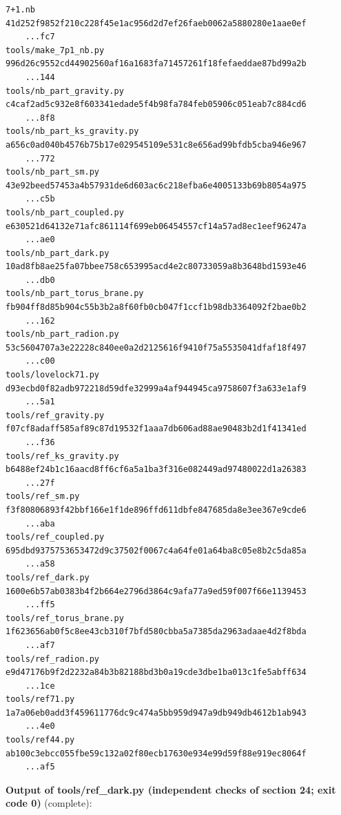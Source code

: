 \documentclass[10pt,a4paper]{article}
\begin{document}
\begin{Verbatim}[fontsize=\small,frame=single,framesep=2mm]
7+1.nb                             41d252f9852f210c228f45e1ac956d2d7ef26faeb0062a5880280e1aae0ef
    ...fc7
tools/make_7p1_nb.py               996d26c9552cd44902560af16a1683fa71457261f18fefaeddae87bd99a2b
    ...144
tools/nb_part_gravity.py           c4caf2ad5c932e8f603341edade5f4b98fa784feb05906c051eab7c884cd6
    ...8f8
tools/nb_part_ks_gravity.py        a656c0ad040b4576b75b17e029545109e531c8e656ad99bfdb5cba946e967
    ...772
tools/nb_part_sm.py                43e92beed57453a4b57931de6d603ac6c218efba6e4005133b69b8054a975
    ...c5b
tools/nb_part_coupled.py           e630521d64132e71afc861114f699eb06454557cf14a57ad8ec1eef96247a
    ...ae0
tools/nb_part_dark.py              10ad8fb8ae25fa07bbee758c653995acd4e2c80733059a8b3648bd1593e46
    ...db0
tools/nb_part_torus_brane.py       fb904ff8d85b904c55b3b2a8f60fb0cb047f1ccf1b98db3364092f2bae0b2
    ...162
tools/nb_part_radion.py            53c5604707a3e22228c840ee0a2d2125616f9410f75a5535041dfaf18f497
    ...c00
tools/lovelock71.py                d93ecbd0f82adb972218d59dfe32999a4af944945ca9758607f3a633e1af9
    ...5a1
tools/ref_gravity.py               f07cf8adaff585af89c87d19532f1aaa7db606ad88ae90483b2d1f41341ed
    ...f36
tools/ref_ks_gravity.py            b6488ef24b1c16aacd8ff6cf6a5a1ba3f316e082449ad97480022d1a26383
    ...27f
tools/ref_sm.py                    f3f80806893f42bbf166e1f1de896ffd611dbfe847685da8e3ee367e9cde6
    ...aba
tools/ref_coupled.py               695dbd9375753653472d9c37502f0067c4a64fe01a64ba8c05e8b2c5da85a
    ...a58
tools/ref_dark.py                  1600e6b57ab0383b4f2b664e2796d3864c9afa77a9ed59f007f66e1139453
    ...ff5
tools/ref_torus_brane.py           1f623656ab0f5c8ee43cb310f7bfd580cbba5a7385da2963adaae4d2f8bda
    ...af7
tools/ref_radion.py                e9d47176b9f2d2232a84b3b82188bd3b0a19cde3dbe1ba013c1fe5abff634
    ...1ce
tools/ref71.py                     1a7a06eb0add3f459611776dc9c474a5bb959d947a9db949db4612b1ab943
    ...4e0
tools/ref44.py                     ab100c3ebcc055fbe59c132a02f80ecb17630e934e99d59f88e919ec8064f
    ...af5
\end{Verbatim}
\textbf{Output of tools/ref\_dark.py (independent checks of section 24; exit code 0)} (complete):
\end{document}
